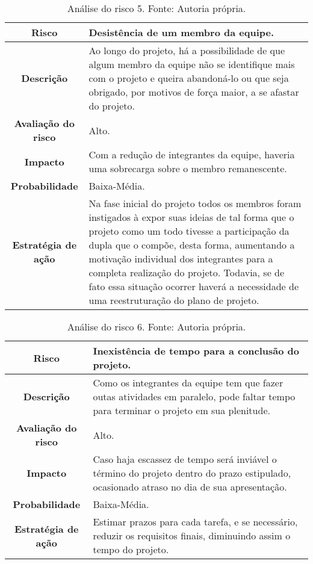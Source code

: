 \begin{table}[h!]
\caption[Análise do risco 5]{Análise do risco 5. Fonte: Autoria própria.}
\begin{center}
\begin{tabular}{|c|p{11cm}|}
\hline
\textbf{Risco} &  Desistência de um membro da equipe. \\
\hline
\textbf{Descrição} & Ao longo do projeto, há a possibilidade de que algum membro da equipe não se identifique mais com o projeto e queira abandoná-lo ou que seja obrigado, por motivos de força maior, a se afastar do projeto.\\
\hline
\textbf{Avaliação do risco} & Alto. \\
\hline
\textbf{Impacto} & Com a redução de integrantes da equipe, haveria uma sobrecarga sobre o membro remanescente. \\ 
\hline
\textbf{Probabilidade} & Baixa-Média.\\
\hline
\textbf{Estratégia de ação} & Na fase inicial do projeto todos os membros foram instigados à expor suas ideias de tal forma que o projeto como um todo tivesse a participação da dupla que o compõe, desta forma, aumentando a motivação individual dos integrantes para a completa realização do projeto. Todavia, se de fato essa situação ocorrer haverá a necessidade de uma reestruturação do plano de projeto.	\\
\hline
\end{tabular}%
\end{center}
\label{tab:risco1}
\end{table}

\begin{table}[h!]
\caption[Análise do risco 6]{Análise do risco 6. Fonte: Autoria própria.}
\begin{center}
\begin{tabular}{|c|p{11cm}|}
\hline
\textbf{Risco} &  Inexistência de tempo para a conclusão do projeto. \\
\hline
\textbf{Descrição} & Como os integrantes da equipe tem que fazer outas atividades em paralelo, pode faltar tempo para terminar o projeto em sua plenitude.\\
\hline
\textbf{Avaliação do risco} & Alto. \\
\hline
\textbf{Impacto} & Caso haja escassez de tempo será inviável o término do projeto dentro do prazo estipulado, ocasionado atraso no dia de sua apresentação.\\ 
\hline
\textbf{Probabilidade} & Baixa-Média.\\
\hline
\textbf{Estratégia de ação} & Estimar prazos para cada tarefa, e se necessário, reduzir os requisitos finais, diminuindo assim o tempo do projeto.	\\
\hline
\end{tabular}%
\end{center}
\label{tab:risco1}
\end{table}